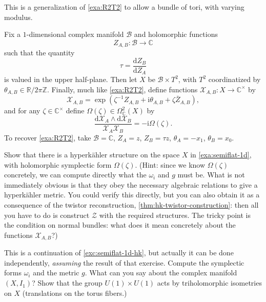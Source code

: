\documentclass[12pt,letterpaper,reqno]{article}
\numberwithin{equation}{section}
\newcommand{\cB}{\ensuremath{\mathcal B}}
\newcommand{\cZ}{\ensuremath{\mathcal Z}}
\newcommand{\cX}{\ensuremath{\mathcal X}}
\newcommand{\R}{\ensuremath{\mathbb R}}
\newcommand{\C}{\ensuremath{\mathbb C}}
\newcommand{\Z}{\ensuremath{\mathbb Z}}
\newcommand{\hk}{hyperk\"ahler\xspace}
\newcommand{\I}{{\mathrm i}}
\newcommand{\de}{\mathrm{d}}
\newcommand{\ti}[1]{\textit{#1}}
\begin{document}
\begin{example} \label{exa:semiflat-1d}
This is a generalization of \autoref{exa:R2T2} to allow a
bundle of tori, with varying modulus.

Fix a $1$-dimensional complex manifold $\cB$
and holomorphic functions 
\begin{equation}
  Z_{A,B}: \cB \to \C
\end{equation}
such that the quantity
\begin{equation}
  \tau = \frac{\de Z_B}{\de Z_A}
\end{equation}
is valued in the upper half-plane.
Then let $X$ be $\cB \times T^2$, with $T^2$
coordinatized by $\theta_{A,B} \in \R / 2 \pi \Z$.
Finally, much like \autoref{exa:R2T2}, define functions
$\cX_{A,B}: X \to \C^\times$ by
\begin{equation}
  \cX_{A,B} = \exp \left(\zeta^{-1} Z_{A,B} + \I \theta_{A,B} + \zeta \bar{Z}_{A,B} \right),
\end{equation}
and for any $\zeta \in \C^\times$ 
define $\Omega(\zeta) \in \Omega^2_\C(X)$ by
\begin{equation}
  \frac{\de \cX_A \wedge \de \cX_B}{\cX_A \cX_B} = -\I \Omega(\zeta).
\end{equation}
To recover \autoref{exa:R2T2}, take $\cB = \C$, 
$Z_A = z$, $Z_B = \tau z$, $\theta_A = - x_1$, $\theta_B = x_0$.
\end{example}

\begin{exercise} \label{exc:semiflat-1d-hk} Show that there is a \hk structure on the 
space $X$ in \autoref{exa:semiflat-1d}, with holomorphic symplectic
form $\Omega(\zeta)$. 
(Hint: since we know $\Omega(\zeta)$ concretely, we can compute
directly what the $\omega_i$ and $g$ must be. What is not immediately
obvious is that they obey the necessary algebraic relations to
give a \hk metric. You could verify this directly, but 
you can also obtain it as a consequence of the twistor
reconstruction, \autoref{thm:hk-twistor-construction}: then all you 
have to do is construct $\cZ$ with the required structures.
The tricky point is the condition on normal bundles: what does
it mean concretely about the functions $\cX_{A,B}$?)
\end{exercise}

\begin{exercise} This is a continuation of
\autoref{exc:semiflat-1d-hk}, but actually it can be done independently, 
\ti{assuming} the result of that exercise.
Compute the symplectic forms $\omega_i$ and the metric $g$.
What can you say about the complex manifold $(X,I_1)$?
Show that the group $U(1) \times U(1)$ acts
by triholomorphic isometries on $X$ (translations on
the torus fibers.)
\end{exercise}
\end{document}
